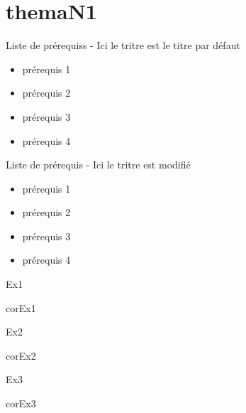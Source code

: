 \documentclass[nocrop]{sesamanuel}
\begin{document}

\themaN
\chapter{themaN1}

\begin{prerequis}
    Liste de prérequiss - Ici le tritre est le titre par défaut
    \begin{itemize}
    \item prérequis 1
    \item prérequis 2
    \item prérequis 3
    \item prérequis 4    
    \end{itemize}
\end{prerequis}

\begin{prerequis}
    Liste de prérequis - Ici le tritre est modifié
    \begin{itemize}
    \item prérequis 1
    \item prérequis 2
    \item prérequis 3
    \item prérequis 4    
    \end{itemize}
\end{prerequis}


\begin{autoeval}
    \begin{multicols}{2}
      \begin{exercice}
        Ex1
      \end{exercice}
      \begin{corrige}
        corEx1
      \end{corrige}
      \begin{exercice}
        Ex2
      \end{exercice}
      \begin{corrige}
        corEx2
      \end{corrige}
  \vfill \columnbreak
      \begin{exercice}
        Ex3
      \end{exercice}
      \begin{corrige}
        corEx3
      \end{corrige}
    \end{multicols}
  \end{autoeval}
\end{document}
